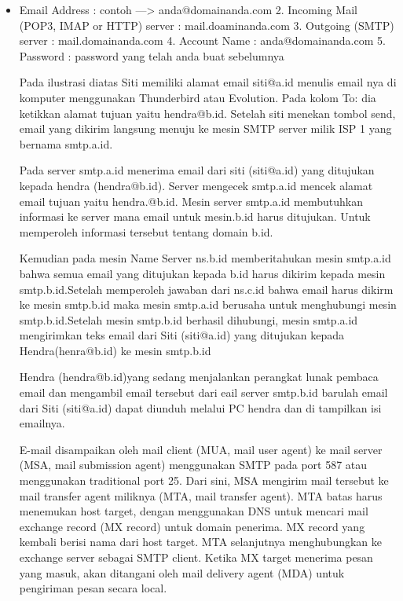 \begin{itemize}
\item Email Address : contoh —> anda@domainanda.com 2. Incoming Mail (POP3, IMAP or HTTP) server : mail.doaminanda.com 3. Outgoing (SMTP) server : mail.domainanda.com 4. Account Name : anda@domainanda.com 5. Password : password yang telah anda buat sebelumnya \par
\vspace{12pt}
Pada ilustrasi diatas Siti memiliki alamat email siti@a.id menulis email nya di komputer menggunakan Thunderbird atau Evolution. Pada kolom To: dia ketikkan alamat tujuan yaitu hendra@b.id. Setelah siti menekan tombol send, email yang dikirim langsung menuju ke mesin SMTP server milik ISP 1 yang bernama smtp.a.id. \par
\vspace{12pt}
Pada server smtp.a.id menerima email dari siti (siti@a.id) yang ditujukan kepada hendra (hendra@b.id). Server mengecek smtp.a.id mencek alamat email tujuan yaitu hendra.@b.id. Mesin server smtp.a.id membutuhkan informasi ke server mana email untuk mesin.b.id harus ditujukan. Untuk memperoleh informasi tersebut tentang domain b.id. \par
\vspace{12pt}
Kemudian pada mesin Name Server ns.b.id memberitahukan mesin smtp.a.id bahwa semua email yang ditujukan kepada b.id harus dikirim kepada mesin smtp.b.id.Setelah memperoleh jawaban dari ns.c.id bahwa email harus dikirm ke mesin smtp.b.id maka mesin smtp.a.id berusaha untuk menghubungi mesin smtp.b.id.Setelah mesin smtp.b.id berhasil dihubungi, mesin smtp.a.id mengirimkan teks email dari Siti (siti@a.id) yang ditujukan kepada Hendra(henra@b.id) ke mesin smtp.b.id \par
\vspace{12pt}
Hendra (hendra@b.id)yang sedang menjalankan perangkat lunak pembaca email dan mengambil email tersebut dari eail server smtp.b.id barulah email dari Siti (siti@a.id) dapat diunduh melalui PC hendra dan di tampilkan isi emailnya. \par
\vspace{12pt}
E-mail disampaikan oleh mail client (MUA, mail user agent) ke mail server (MSA, mail submission agent) menggunakan SMTP pada port 587 atau menggunakan traditional port 25. Dari sini, MSA mengirim mail tersebut ke mail transfer agent miliknya (MTA, mail transfer agent). MTA batas harus menemukan host target, dengan menggunakan DNS untuk mencari mail exchange record (MX record) untuk domain penerima. MX record yang kembali berisi nama dari host target. MTA selanjutnya menghubungkan ke exchange server sebagai SMTP client. Ketika MX target menerima pesan yang masuk, akan ditangani oleh mail delivery agent (MDA) untuk pengiriman pesan secara local. \par

\end{itemize}
